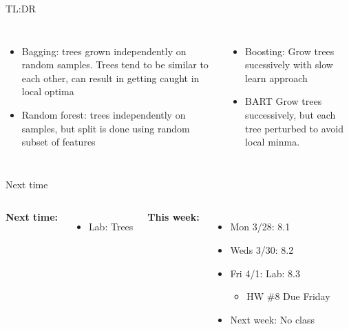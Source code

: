 \documentclass[aspectratio=169,usenames,dvipsnames]{beamer}
\newcommand{\InstructorList}[1]{
\begin{itemize}
	\color{orange}
	#1
\end{itemize}
}
\begin{document}
\begin{frame}[c]{TL:DR}

\begin{columns}
\centering


\InstructorList{
  \item Bagging: trees grown independently on random samples. Trees tend to be similar to each other, can result in getting caught in local optima
	\item Random forest: trees independently on samples, but split is done using random subset of features

}

\centering
\InstructorList{
  \item Boosting: Grow trees sucessively with slow learn approach
	\item BART Grow trees successively, but each tree perturbed to avoid local minma.
}

\end{columns}
\end{frame}




\begin{frame}[t]{Next time}


\begin{columns}
\centering

\textbf{Next time:}

\begin{itemize}
	\item Lab: Trees
\end{itemize}

\centering

\textbf{This week:}
\begin{itemize}

	\item Mon 3/28: 8.1
	\item Weds 3/30: 8.2
	\item Fri 4/1: Lab: 8.3
	\begin{itemize}
		\item HW \#8 Due Friday
	\end{itemize}
	\item Next week: No class
\end{itemize}
	\end{columns}

\end{frame}
\end{document}
